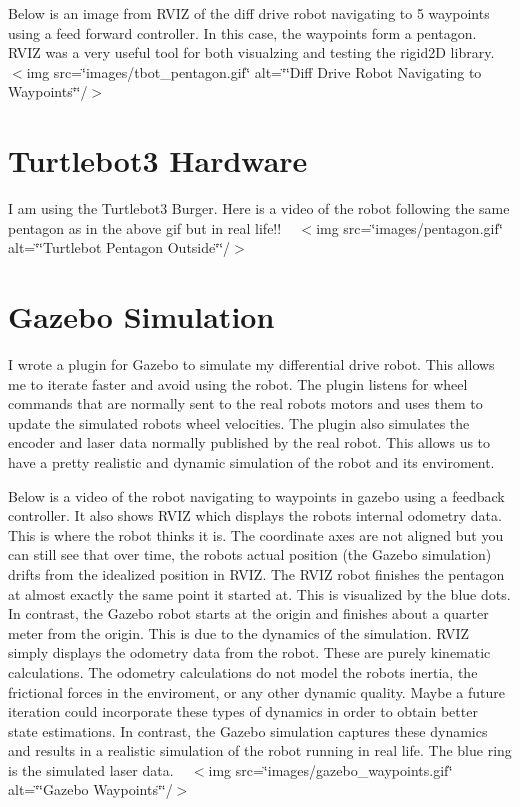 Below is an image from R\+V\+IZ of the diff drive robot navigating to 5 waypoints using a feed forward controller. In this case, the waypoints form a pentagon. R\+V\+IZ was a very useful tool for both visualzing and testing the rigid2D library. ~\newline
 $<$img src=\char`\"{}images/tbot\+\_\+pentagon.\+gif\char`\"{} alt=\char`\"{}\char`\"{}Diff Drive Robot Navigating to Waypoints\char`\"{}\char`\"{}/$>$

\section*{Turtlebot3 Hardware}

I am using the Turtlebot3 Burger. Here is a video of the robot following the same pentagon as in the above gif but in real life!! ~\newline
 $<$img src=\char`\"{}images/pentagon.\+gif\char`\"{} alt=\char`\"{}\char`\"{}Turtlebot Pentagon Outside\char`\"{}\char`\"{}/$>$

\section*{Gazebo Simulation}

I wrote a plugin for Gazebo to simulate my differential drive robot. This allows me to iterate faster and avoid using the robot. The plugin listens for wheel commands that are normally sent to the real robot\textquotesingle{}s motors and uses them to update the simulated robot\textquotesingle{}s wheel velocities. The plugin also simulates the encoder and laser data normally published by the real robot. This allows us to have a pretty realistic and dynamic simulation of the robot and its enviroment.

Below is a video of the robot navigating to waypoints in gazebo using a feedback controller. It also shows R\+V\+IZ which displays the robot\textquotesingle{}s internal odometry data. This is where the robot thinks it is. The coordinate axes are not aligned but you can still see that over time, the robot\textquotesingle{}s actual position (the Gazebo simulation) drifts from the idealized position in R\+V\+IZ. The R\+V\+IZ robot finishes the pentagon at almost exactly the same point it started at. This is visualized by the blue dots. In contrast, the Gazebo robot starts at the origin and finishes about a quarter meter from the origin. This is due to the dynamics of the simulation. R\+V\+IZ simply displays the odometry data from the robot. These are purely kinematic calculations. The odometry calculations do not model the robot\textquotesingle{}s inertia, the frictional forces in the enviroment, or any other dynamic quality. Maybe a future iteration could incorporate these types of dynamics in order to obtain better state estimations. In contrast, the Gazebo simulation captures these dynamics and results in a realistic simulation of the robot running in real life. The blue ring is the simulated laser data. ~\newline
 $<$img src=\char`\"{}images/gazebo\+\_\+waypoints.\+gif\char`\"{} alt=\char`\"{}\char`\"{}Gazebo Waypoints\char`\"{}\char`\"{}/$>$ \href{http://www.youtube.com/watch?v=eHXuRXVKE6k}{\tt }

